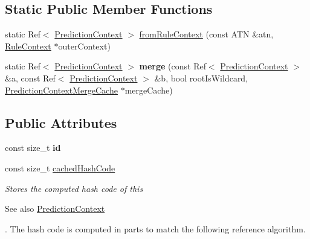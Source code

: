 \subsection*{Static Public Member Functions}
\begin{DoxyCompactItemize}
\item 
static Ref$<$ \hyperlink{classantlr4_1_1atn_1_1PredictionContext}{Prediction\+Context} $>$ \hyperlink{classantlr4_1_1atn_1_1PredictionContext_acb46f102c66b1ae67b44f092e9d78da4}{from\+Rule\+Context} (const A\+TN \&atn, \hyperlink{classantlr4_1_1RuleContext}{Rule\+Context} $\ast$outer\+Context)
\item 
\mbox{\label{classantlr4_1_1atn_1_1PredictionContext_a229db841e8d951f20be56c1ad9a9e897}} 
static Ref$<$ \hyperlink{classantlr4_1_1atn_1_1PredictionContext}{Prediction\+Context} $>$ {\bfseries merge} (const Ref$<$ \hyperlink{classantlr4_1_1atn_1_1PredictionContext}{Prediction\+Context} $>$ \&a, const Ref$<$ \hyperlink{classantlr4_1_1atn_1_1PredictionContext}{Prediction\+Context} $>$ \&b, bool root\+Is\+Wildcard, \hyperlink{classantlr4_1_1atn_1_1PredictionContextMergeCache}{Prediction\+Context\+Merge\+Cache} $\ast$merge\+Cache)
\end{DoxyCompactItemize}
\subsection*{Public Attributes}
\begin{DoxyCompactItemize}
\item 
\mbox{\label{classantlr4_1_1atn_1_1PredictionContext_aca6784875c006ea77ef6687e6c316e41}} 
const size\+\_\+t {\bfseries id}
\item 
const size\+\_\+t \hyperlink{classantlr4_1_1atn_1_1PredictionContext_a2eb2612faaa082712dd779c13f588633}{cached\+Hash\+Code}
\begin{DoxyCompactList}\small\item\em Stores the computed hash code of this \begin{DoxySeeAlso}{See also}
\hyperlink{classantlr4_1_1atn_1_1PredictionContext}{Prediction\+Context}


\end{DoxySeeAlso}
. The hash code is computed in parts to match the following reference algorithm. \end{DoxyCompactList}\end{DoxyCompactItemize}
